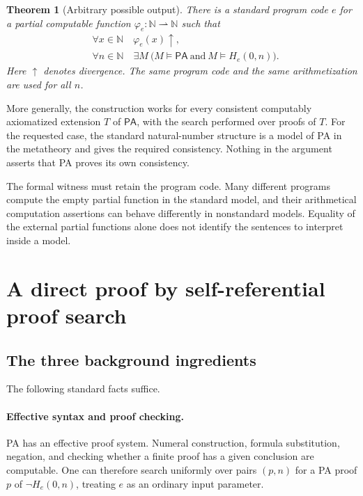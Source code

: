 \documentclass[11pt]{article}
\newcommand{\N}{\mathbb N}
\newcommand{\PA}{\mathsf{PA}}
\newcommand{\pto}{\rightharpoonup}
\newtheorem{theorem}{Theorem}[section]
\theoremstyle{definition}
\theoremstyle{remark}
\begin{document}
\begin{theorem}[Arbitrary possible output]\label{thm:main}
There is a standard program code $e$ for a partial computable function
$\varphi_e:\N\pto\N$ such that
\begin{align}
 &\forall x\in\N\quad \varphi_e(x)\uparrow, \label{eq:diverge}\\
 &\forall n\in\N\quad
   \exists M\ \bigl(M\models\PA\ \text{and}\ M\models H_e(0,n)\bigr).
   \label{eq:models}
\end{align}
Here $\uparrow$ denotes divergence. The same program code and the same
arithmetization are used for all $n$.
\end{theorem}

More generally, the construction works for every consistent computably
axiomatized extension $T$ of $\PA$, with the search performed over proofs
of $T$. For the requested case, the standard natural-number structure is
a model of PA in the metatheory and gives the required consistency.
Nothing in the argument asserts that PA proves its own consistency.

The formal witness must retain the program code. Many different programs
compute the empty partial function in the standard model, and their
arithmetical computation assertions can behave differently in nonstandard
models. Equality of the external partial functions alone does not identify
the sentences to interpret inside a model.

\section{A direct proof by self-referential proof search}

\subsection{The three background ingredients}

The following standard facts suffice.

\paragraph{Effective syntax and proof checking.}
PA has an effective proof system. Numeral construction, formula
substitution, negation, and checking whether a finite proof has a given
conclusion are computable. One can therefore search uniformly over pairs
$(p,n)$ for a PA proof $p$ of $\neg H_e(0,n)$, treating $e$ as an ordinary
input parameter.
\end{document}
